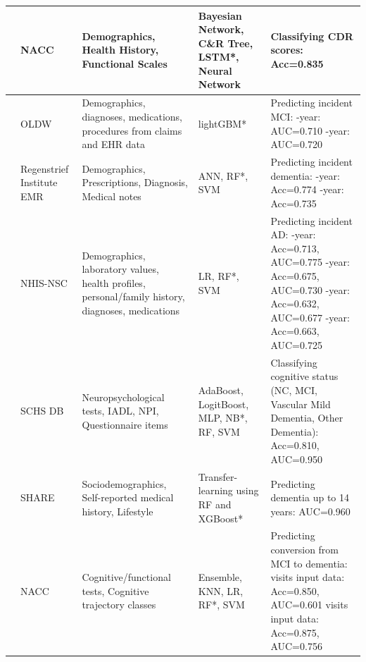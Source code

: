 \begin{landscape}
\begin{longtable}{|M{0.15\textwidth}|M{0.15\textwidth}|M{0.4\textwidth}|M{0.3\textwidth}|M{0.5\textwidth}|}
\cite{Wang2018Early} & NACC & Demographics, Health History, Functional Scales & Bayesian Network, C\&R Tree, LSTM*, Neural Network & Classifying CDR scores: Acc=0.835 \\ 
\hline

\cite{Nori2019Machine} & OLDW & Demographics, diagnoses, medications, procedures from claims and EHR data & lightGBM* & Predicting incident MCI: -year: AUC=0.710 -year: AUC=0.720 \\ 
\hline

\cite{Ben2020Predicting} & Regenstrief Institute EMR & Demographics, Prescriptions, Diagnosis, Medical notes & ANN, RF*, SVM & Predicting incident dementia: -year: Acc=0.774 -year: Acc=0.735 \\ 
\hline

\cite{Park2020Machine} & NHIS-NSC & Demographics, laboratory values, health profiles, personal/family history, diagnoses, medications & LR, RF*, SVM & Predicting incident AD: -year: Acc=0.713, AUC=0.775 -year: Acc=0.675, AUC=0.730 -year: Acc=0.632, AUC=0.677 -year: Acc=0.663, AUC=0.725 \\ 
\hline

\cite{Zhu2020Machine} & SCHS DB & Neuropsychological tests, IADL, NPI, Questionnaire items & AdaBoost, LogitBoost, \acrshort{MLP}, NB*, RF, SVM & Classifying cognitive status (NC, MCI, Vascular Mild Dementia, Other Dementia): Acc=0.810, AUC=0.950 \\ 
\hline

\cite{Danso2021Developing} & SHARE & Sociodemographics, Self-reported medical history, Lifestyle & Transfer-learning using RF and XGBoost* & Predicting dementia up to 14 years: AUC=0.960 \\ 
\hline

\cite{Bucholc2023Hybrid} & NACC & Cognitive/functional tests, Cognitive trajectory classes & Ensemble, \acrshort{KNN}, LR, RF*, SVM & Predicting conversion from MCI to dementia:  visits input data: Acc=0.850, AUC=0.601  visits input data: Acc=0.875, AUC=0.756 \\ 
\hline


\end{longtable}
\end{landscape}
